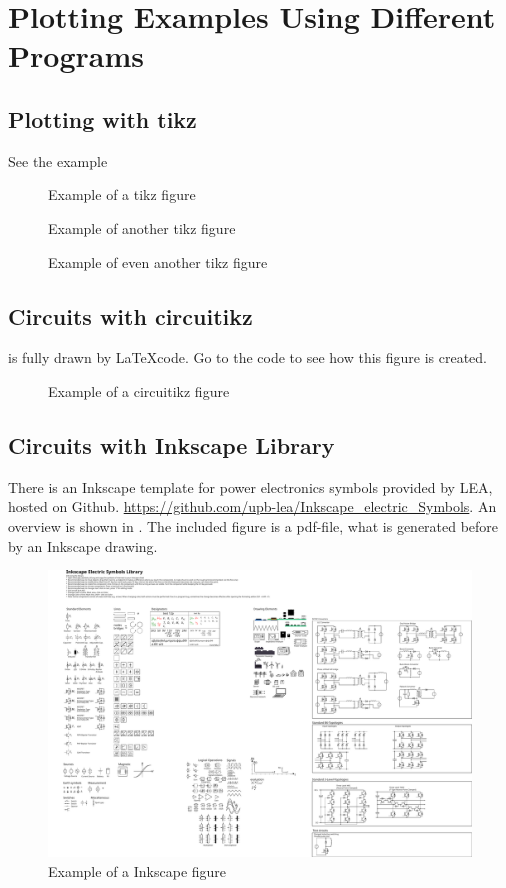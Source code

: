 \chapter{Plotting Examples Using Different Programs} 
\label{cha:evaluation}

\section{Plotting with tikz}

See the example 
\begin{figure}[ht]
    \centering
    
    \caption{Example of a tikz figure}
    \label{fig:tikz_example_01}
\end{figure}
\begin{figure}[ht]
    \centering
    
    \caption{Example of another tikz figure}
    \label{fig:tikz_example_02}
\end{figure}
\begin{figure}[ht]
    \centering
    
    \caption{Example of even another tikz figure}
    \label{fig:tikz_example_03}
\end{figure}



\section{Circuits with circuitikz}
 is fully drawn by \LaTeX code. Go to the code to see how this figure is created.
\begin{figure}[ht]
    \centering
    
    \caption{Example of a circuitikz figure}
    \label{fig:circuitikz_example}
\end{figure}

\section{Circuits with Inkscape Library}
There is an Inkscape template for power electronics symbols provided by LEA, hosted on Github. \href{https://github.com/upb-lea/Inkscape_electric_Symbols}{https://github.com/upb-lea/Inkscape\_electric\_Symbols}. An overview is shown in . The included figure is a pdf-file, what is generated before by an Inkscape drawing.

\begin{figure}[ht]
	\centering
    \includegraphics[]{fig/inkscape/Inkscape_Symbols_All.pdf}
	\caption{Example of a Inkscape figure}
	\label{fig:inkscape_example}
\end{figure}

